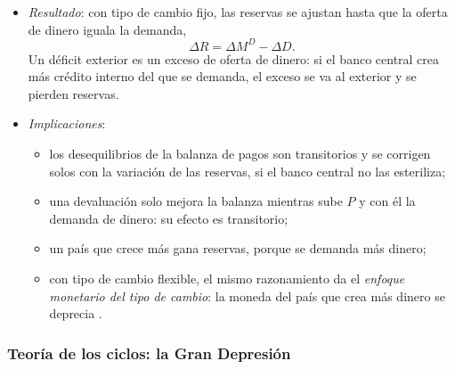 \documentclass[11pt]{article}
\begin{document}
\begin{itemize}
\begin{itemize}
  \item \emph{Resultado}: con tipo de cambio fijo, las reservas se ajustan hasta que la oferta de dinero iguala la demanda,
  \begin{equation}
  \Delta R=\Delta M^D-\Delta D. \label{eq:enfoque-monetario}
  \end{equation}
  Un déficit exterior es un exceso de oferta de dinero: si el banco central crea más crédito interno del que se demanda, el exceso se va al exterior y se pierden reservas.
  \item \emph{Implicaciones}:
    \begin{itemize}
    \item los desequilibrios de la balanza de pagos son transitorios y se corrigen solos con la variación de las reservas, si el banco central no las esteriliza;
    \item una devaluación solo mejora la balanza mientras sube $P$ y con él la demanda de dinero: su efecto es transitorio;
    \item un país que crece más gana reservas, porque se demanda más dinero;
    \item con tipo de cambio flexible, el mismo razonamiento da el \emph{enfoque monetario del tipo de cambio}: la moneda del país que crea más dinero se deprecia .
    \end{itemize}
  \end{itemize}
\end{itemize}

\subsubsection{Teoría de los ciclos: la Gran Depresión}\label{sec:ciclos}
\end{document}
